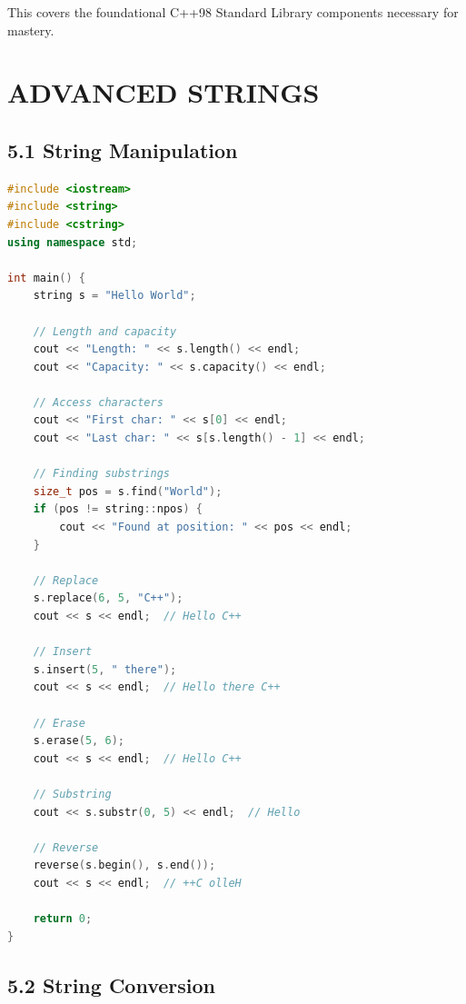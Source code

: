 This covers the foundational C++98 Standard Library components necessary
for mastery.

\hypertarget{advanced-strings}{%
\chapter{ADVANCED STRINGS}\label{advanced-strings}}

\hypertarget{string-manipulation}{%
\section{5.1 String Manipulation}\label{string-manipulation}}

\begin{lstlisting}[language={C++}]
#include <iostream>
#include <string>
#include <cstring>
using namespace std;

int main() {
    string s = "Hello World";
    
    // Length and capacity
    cout << "Length: " << s.length() << endl;
    cout << "Capacity: " << s.capacity() << endl;
    
    // Access characters
    cout << "First char: " << s[0] << endl;
    cout << "Last char: " << s[s.length() - 1] << endl;
    
    // Finding substrings
    size_t pos = s.find("World");
    if (pos != string::npos) {
        cout << "Found at position: " << pos << endl;
    }
    
    // Replace
    s.replace(6, 5, "C++");
    cout << s << endl;  // Hello C++
    
    // Insert
    s.insert(5, " there");
    cout << s << endl;  // Hello there C++
    
    // Erase
    s.erase(5, 6);
    cout << s << endl;  // Hello C++
    
    // Substring
    cout << s.substr(0, 5) << endl;  // Hello
    
    // Reverse
    reverse(s.begin(), s.end());
    cout << s << endl;  // ++C olleH
    
    return 0;
}
\end{lstlisting}

\hypertarget{string-conversion}{%
\section{5.2 String Conversion}\label{string-conversion}}

